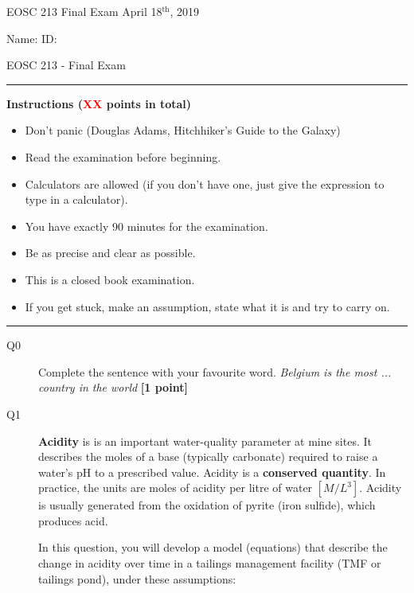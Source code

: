 \documentclass{article}
\begin{document}
\pagestyle{first}


\large{EOSC 213 Final Exam} \hspace{10cm} \large{April 18$^{\textrm{th}}$, 2019}

\large{Name:} \hspace{12cm} \large{ID: }
\begin{center}
\Huge{EOSC 213 - Final Exam}
\end{center}

\rule{\textwidth}{1pt}

\large{\textbf{Instructions (\textcolor{red}{XX} points in total)}}
\begin{multicols}{2}
\begin{itemize}
\item Don't panic (Douglas Adams, Hitchhiker's Guide to the Galaxy)
\item Read the examination before beginning.
\item Calculators are allowed (if you don't have one, just give the expression to type in a calculator).
\item You have exactly 90 minutes for the examination.
\item Be as precise and clear as possible.
\item This is a closed book examination.
\item If you get stuck, make an assumption, state what it is and try to carry on.
\end{itemize} 
\end{multicols}



\rule{\textwidth}{1pt}

\begin{description}
\item [Q0] Complete the sentence with your favourite word. \textit{Belgium is the most ... country in the world}  \textbf{[1 point]}
\vspace{0.5cm}

\end{description}


\begin{description}
\item[Q1] \textbf{Acidity} is is an important water-quality parameter at mine sites. It describes the moles of a base (typically carbonate) required to raise a water's pH to a prescribed value. Acidity is a \textbf{conserved quantity}. In practice, the units are moles of acidity per litre of water $[M/L^3]$. Acidity is usually generated from the oxidation of pyrite (iron sulfide), which produces acid.  


In this question, you will develop a model (equations) that describe the change in acidity over time in a tailings management facility (TMF or tailings pond), under these assumptions:
\end{description}
\end{document}
